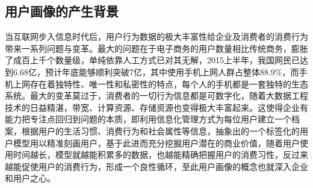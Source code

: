 	\subsection{用户画像的产生背景}
	当互联网步入信息时代后，用户行为数据的极大丰富性给企业及消费者的消费行为带来一系列问题与变革。最大的问题在于电子商务的用户数量相比传统商务，膨胀了成百上千个数量级，单纯依靠人工方式已对其无解，2015上半年，我国网民已达到6.68亿，预计年底能够顺利突破7亿，其中使用手机上网人群占整体88.9\%，而手机上网存在着独特性、唯一性和私密性的特点，每个人的手机都是一套独特的生态系统。最大的变革莫过于，消费者的一切行为信息都是可数字化，随着大数据工程技术的日益精湛，带宽、计算资源、存储资源也变得极大丰富起来。这使得企业有能力把专注点回归到问题的本质，即利用信息化管理方式为每位用户建立一个档案，根据用户的生活习惯、消费行为和社会属性等信息，抽象出的一个标签化的用户模型用以精准刻画用户，基于此进而充分挖掘用户潜在的商业价值，随着用户使用时间越长，模型就越能积累多的数据，也越能精确把握用户的消费习性，反过来越能促使用户的消费行为，形成一个良性循环，至此用户画像的概念也就深入企业和用户之心。

